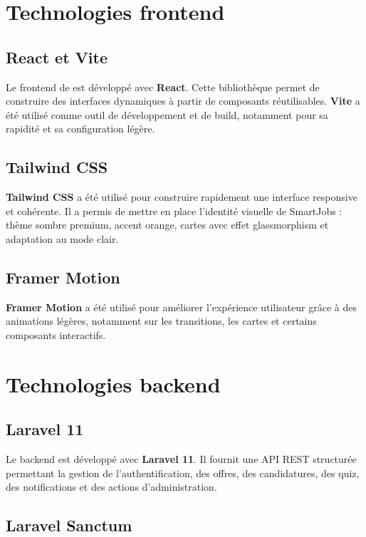 \section{Technologies frontend}

\subsection{React et Vite}

\noindent
Le frontend de \projectName{} est développé avec \textbf{React}. Cette bibliothèque permet de construire des interfaces dynamiques à partir de composants réutilisables. \textbf{Vite} a été utilisé comme outil de développement et de build, notamment pour sa rapidité et sa configuration légère.

\subsection{Tailwind CSS}

\noindent
\textbf{Tailwind CSS} a été utilisé pour construire rapidement une interface responsive et cohérente. Il a permis de mettre en place l'identité visuelle de SmartJobs : thème sombre premium, accent orange, cartes avec effet glassmorphism et adaptation au mode clair.

\subsection{Framer Motion}

\noindent
\textbf{Framer Motion} a été utilisé pour améliorer l'expérience utilisateur grâce à des animations légères, notamment sur les transitions, les cartes et certains composants interactifs.

\section{Technologies backend}

\subsection{Laravel 11}

\noindent
Le backend est développé avec \textbf{Laravel 11}. Il fournit une API REST structurée permettant la gestion de l'authentification, des offres, des candidatures, des quiz, des notifications et des actions d'administration.

\subsection{Laravel Sanctum}

